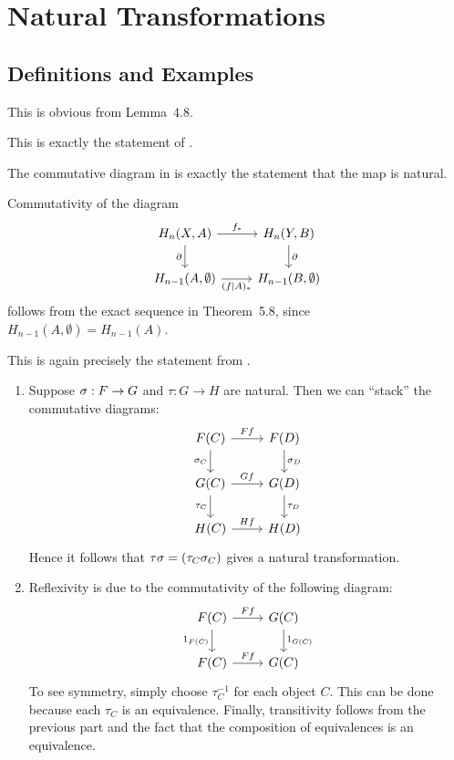 \documentclass[../../solutions.tex]{subfiles}
\begin{document}
\section{Natural Transformations}
\subsection{Definitions and Examples}
\begin{exercise} \leavevmode
This is obvious from Lemma~4.8.
\end{exercise}

\begin{exercise} \leavevmode
This is exactly the statement of .
\end{exercise}

\begin{exercise} \leavevmode
The commutative diagram in  is exactly the statement that the map is natural.
\end{exercise}

\begin{exercise} \leavevmode
Commutativity of the diagram
\[
\begin{tikzcd}
H_n(X,A)\ar[r,"f_*"]\ar[d,"\partial",swap] & H_n(Y,B)\ar[d,"\partial"]\\
H_{n-1}(A,\emptyset)\ar[r,"(f|A)_*",swap] & H_{n-1}(B,\emptyset)
\end{tikzcd}
\]
follows from the exact sequence in Theorem~5.8, since $H_{n-1}(A,\emptyset)=H_{n-1}(A)$.
\end{exercise}

\begin{exercise} \leavevmode
This is again precisely the statement from .
\end{exercise}

\begin{exercise} \leavevmode
\begin{enumerate}
\item
Suppose $\sigma:F\to G$ and $\tau:G\to H$ are natural.
Then we can ``stack'' the commutative diagrams:
\[
\begin{tikzcd}
F(C)\ar[r,"Ff"]\ar[d,"\sig_C",swap] & F(D)\ar[d,"\sig_D"]\\
G(C)\ar[r,"Gf"]\ar[d,"\tau_C",swap] & G(D)\ar[d,"\tau_D"]\\
H(C)\ar[r,"Hf"] & H(D)
\end{tikzcd}
\]
Hence it follows that $\tau\sigma=(\tau_C\sigma_C)$ gives a natural transformation.

\item
Reflexivity is due to the commutativity of the following diagram:
\[
\begin{tikzcd}
F(C)\ar[r,"Ff"]\ar[d,"1_{F(C)}",swap] & G(C)\ar[d,"1_{G(C)}"]\\
F(C)\ar[r,"Ff"] & G(C)
\end{tikzcd}
\]
To see symmetry, simply choose $\tau_C^{-1}$ for each object $C$.
This can be done because each $\tau_C$ is an equivalence.
Finally, transitivity follows from the previous part and the fact that the composition of equivalences is an equivalence.
\end{enumerate}
\end{exercise}
\end{document}
